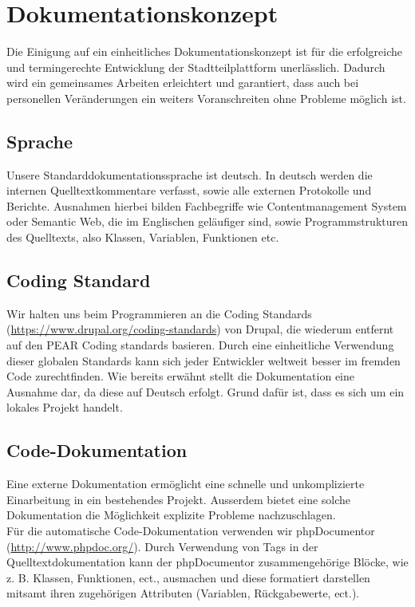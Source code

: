 \documentclass{swp}
\begin{document}
\\\\\\\\\\

\tableofcontents
\newpage
\section{Dokumentationskonzept}
Die Einigung auf ein einheitliches Dokumentationskonzept ist f\"ur die erfolgreiche und termingerechte Entwicklung der Stadtteilplattform unerl\"asslich. Dadurch wird ein gemeinsames Arbeiten erleichtert und garantiert, dass auch bei personellen Ver\"anderungen ein weiters Voranschreiten ohne Probleme m\"oglich ist.
\subsection{Sprache}
Unsere Standarddokumentationssprache ist deutsch. In deutsch werden die internen Quelltextkommentare verfasst, sowie alle externen Protokolle und Berichte. Ausnahmen hierbei bilden Fachbegriffe wie Contentmanagement System oder Semantic Web, die im Englischen gel\"aufiger sind, sowie Programmstrukturen des Quelltexts, also Klassen, Variablen, Funktionen etc.
\subsection{Coding Standard}
Wir halten uns beim Programmieren an die Coding Standards\\(\url{https://www.drupal.org/coding-standards}) von Drupal, die wiederum entfernt auf den \glqq PEAR Coding standards\grqq{} basieren. Durch eine einheitliche Verwendung dieser globalen Standards kann sich jeder Entwickler weltweit besser im fremden Code zurechtfinden. Wie bereits erw\"ahnt stellt die Dokumentation eine Ausnahme dar, da diese auf Deutsch erfolgt. Grund daf\"ur ist, dass es sich um ein lokales Projekt handelt.
\subsection{Code-Dokumentation}
Eine externe Dokumentation erm\"oglicht eine schnelle und unkomplizierte Einarbeitung in ein bestehendes Projekt. Au{ss}erdem bietet eine solche Dokumentation die M\"oglichkeit explizite Probleme nachzuschlagen.\\
F\"ur die automatische Code-Dokumentation verwenden wir phpDocumentor \\(\url{http://www.phpdoc.org/}). Durch Verwendung von Tags in der Quelltextdokumentation kann der phpDocumentor zusammengeh\"orige Bl\"ocke, wie z. B. Klassen, Funktionen, ect., ausmachen und diese formatiert darstellen mitsamt ihren zugeh\"origen Attributen (Variablen, R\"uckgabewerte, ect.).
\end{document}
